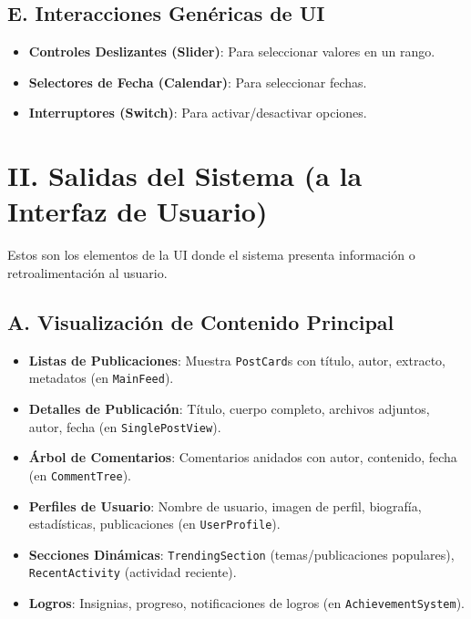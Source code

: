 \documentclass{article}
\begin{document}
	\subsection*{E. Interacciones Genéricas de UI}
	\begin{itemize}
		\item \textbf{Controles Deslizantes (Slider)}: Para seleccionar valores en un
			rango.

		\item \textbf{Selectores de Fecha (Calendar)}: Para seleccionar fechas.

		\item \textbf{Interruptores (Switch)}: Para activar/desactivar opciones.
	\end{itemize}

	\section*{II. Salidas del Sistema (a la Interfaz de Usuario)}
	Estos son los elementos de la UI donde el sistema presenta información o retroalimentación
	al usuario.

	\subsection*{A. Visualización de Contenido Principal}
	\begin{itemize}
		\item \textbf{Listas de Publicaciones}: Muestra \texttt{PostCard}s con título,
			autor, extracto, metadatos (en \texttt{MainFeed}).

		\item \textbf{Detalles de Publicación}: Título, cuerpo completo, archivos adjuntos,
			autor, fecha (en \texttt{SinglePostView}).

		\item \textbf{Árbol de Comentarios}: Comentarios anidados con autor,
			contenido, fecha (en \texttt{CommentTree}).

		\item \textbf{Perfiles de Usuario}: Nombre de usuario, imagen de perfil, biografía,
			estadísticas, publicaciones (en \texttt{UserProfile}).

		\item \textbf{Secciones Dinámicas}: \texttt{TrendingSection} (temas/publicaciones
			populares), \texttt{RecentActivity} (actividad reciente).

		\item \textbf{Logros}: Insignias, progreso, notificaciones de logros (en
			\texttt{AchievementSystem}).
	\end{itemize}
\end{document}
